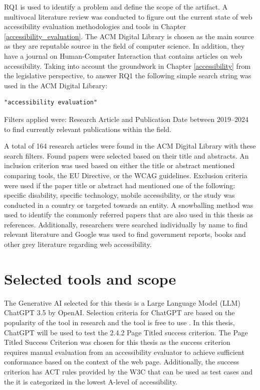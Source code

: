 RQ1 is used to identify a problem and define the scope of the artifact. A multivocal literature review was conducted to figure out the current state of web accessibility evaluation methodologies and tools in Chapter \ref{accessibility_evaluation}. The ACM Digital Library is chosen as the main source as they are reputable source in the field of computer science. In addition, they have a journal on Human-Computer Interaction that contains articles on web accessibility. Taking into account the groundwork in Chapter \ref{accessibility} from the legislative perspective, to answer RQ1 the following simple search string was used in the ACM Digital Library:

\begin{verbatim}
"accessibility evaluation"
\end{verbatim}

Filters applied were: Research Article and Publication Date between 2019--2024 to find currently relevant publications within the field. 

A total of 164 research articles were found in the ACM Digital Library with these search filters. Found papers were selected based on their title and abstracts. An inclusion criterion was used based on either the title or abstract mentioned comparing tools, the EU Directive, or the WCAG guidelines. Exclusion criteria were used if the paper title or abstract had mentioned one of the following: specific disability, specific technology, mobile accessibility, or the study was conducted in a country or targeted towards an entity. A snowballing method was used to identify the commonly referred papers that are also used in this thesis as references. Additionally, researchers were searched individually by name to find relevant literature and Google was used to find government reports, books and other grey literature regarding web accessibility.

\section{Selected tools and scope}

The Generative AI selected for this thesis is a Large Language Model (LLM) ChatGPT 3.5 by OpenAI. Selection criteria for ChatGPT are based on the popularity of the tool in research and the tool is free to use \citep{ouyang2023llm, white2023prompt}. In this thesis, ChatGPT will be used to test the 2.4.2 Page Titled success criterion. The Page Titled Success Criterion was chosen for this thesis as the success criterion requires manual evaluation from an accessibility evaluator to achieve sufficient conformance based on the context of the web page. Additionally, the success criterion has ACT rules provided by the W3C that can be used as test cases and the it is categorized in the lowest A-level of accessibility. 

